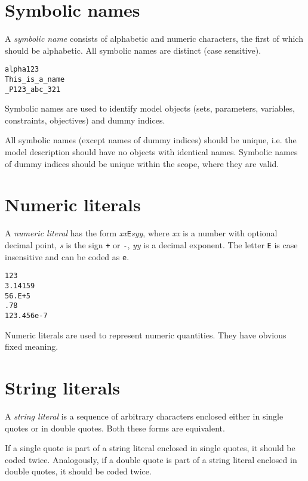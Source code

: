 \documentclass[11pt]{report}
\def\para#1{\noindent{\bf#1}}
\begin{document}
\section{Symbolic names}

A {\it symbolic name} consists of alphabetic and numeric characters,
the first of which should be alphabetic. All symbolic names are
distinct (case sensitive).

\para{Examples}

\begin{verbatim}
alpha123
This_is_a_name
_P123_abc_321
\end{verbatim}

Symbolic names are used to identify model objects (sets, parameters,
variables, constraints, objectives) and dummy indices.

All symbolic names (except names of dummy indices) should be unique,
i.e. the model description should have no objects with identical names.
Symbolic names of dummy indices should be unique within the scope,
where they are valid.

\section{Numeric literals}

A {\it numeric literal} has the form {\it xx}{\tt E}{\it syy}, where
{\it xx} is a number with optional decimal point, {\it s} is the sign
{\tt+} or {\tt-}, {\it yy} is a decimal exponent. The letter {\tt E} is
case insensitive and can be coded as {\tt e}.

\para{Examples}

\begin{verbatim}
123
3.14159
56.E+5
.78
123.456e-7
\end{verbatim}

Numeric literals are used to represent numeric quantities. They have
obvious fixed meaning.

\section{String literals}

A {\it string literal} is a sequence of arbitrary characters enclosed
either in single quotes or in double quotes. Both these forms are
equivalent.

If a single quote is part of a string literal enclosed in single
quotes, it should be coded twice. Analogously, if a double quote is
part of a string literal enclosed in double quotes, it should be coded
twice.
\end{document}
